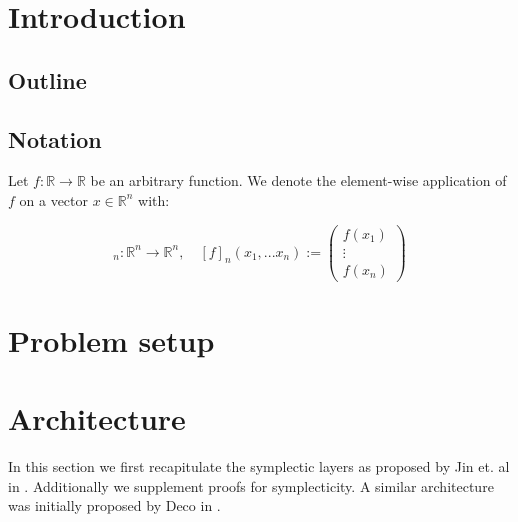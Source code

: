 \documentclass[twoside,a4paper]{article}
\begin{document}
\section{Introduction}

\subsection{Outline}

\subsection{Notation}

Let $ f: \mathbb{R} \rightarrow \mathbb{R} $ be an arbitrary function. We denote
the element-wise application of $f$ on a vector $x \in \mathbb{R}^n$ with:

\begin{equation*}
	[f]_n: \mathbb{R}^n \rightarrow \mathbb{R}^n, \quad 
	[f]_n(x_1, ... x_n) := \begin{pmatrix}
		f(x_1) \\
		\vdots \\
		f(x_n)
	\end{pmatrix}
\end{equation*}


%
%
\newpage
\section{Problem setup}

\section{Architecture}

In this section we first recapitulate the symplectic layers as proposed by Jin et. al 
in \cite{Jin2020} . Additionally we supplement proofs for 
symplecticity. A similar architecture was initially proposed by Deco in \cite{Deco1995} 
.
\end{document}
